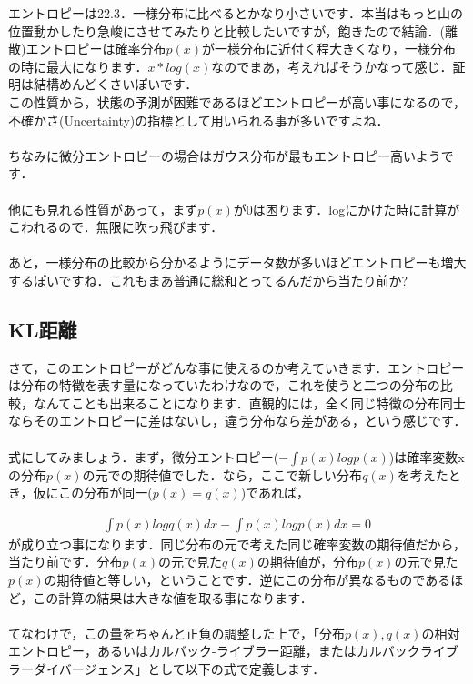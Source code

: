 \documentclass[11pt,a4paper]{jsarticle}                    %
\begin{document}
エントロピーは22.3．一様分布に比べるとかなり小さいです．本当はもっと山の位置動かしたり急峻にさせてみたりと比較したいですが，飽きたので結論．(離散)エントロピーは確率分布$p(x)$が一様分布に近付く程大きくなり，一様分布の時に最大になります．$x * log(x)$なのでまあ，考えればそうかなって感じ．証明は結構めんどくさいぽいです．\\
この性質から，状態の予測が困難であるほどエントロピーが高い事になるので，不確かさ(Uncertainty)の指標として用いられる事が多いですよね．\\
\\
ちなみに微分エントロピーの場合はガウス分布が最もエントロピー高いようです．\\
\\
他にも見れる性質があって，まず$p(x)$が0は困ります．logにかけた時に計算がこわれるので．無限に吹っ飛びます．\\
\\
あと，一様分布の比較から分かるようにデータ数が多いほどエントロピーも増大するぽいですね．これもまあ普通に総和とってるんだから当たり前か?

\subsection{KL距離}
さて，このエントロピーがどんな事に使えるのか考えていきます．エントロピーは分布の特徴を表す量になっていたわけなので，これを使うと二つの分布の比較，なんてことも出来ることになります．直観的には，全く同じ特徴の分布同士ならそのエントロピーに差はないし，違う分布なら差がある，という感じです．\\
\\
式にしてみましょう．まず，微分エントロピー($- \int p(x) log p(x)$)は確率変数xの分布$p(x)$の元での期待値でした．なら，ここで新しい分布$q(x)$を考えたとき，仮にこの分布が同一($p(x) = q(x)$)であれば，

\begin{eqnarray}
\label{eq:KL1}
  \int p(x) log q(x)dx - \int p(x) log p(x)dx= 0
\end{eqnarray}
が成り立つ事になります．同じ分布の元で考えた同じ確率変数の期待値だから，当たり前です．分布$p(x)$の元で見た$q(x)$の期待値が，分布$p(x)$の元で見た$p(x)$の期待値と等しい，ということです．逆にこの分布が異なるものであるほど，この計算の結果は大きな値を取る事になります．\\
\\
てなわけで，この量をちゃんと正負の調整した上で，「分布$p(x), q(x)$の相対エントロピー，あるいはカルバック-ライブラー距離，またはカルバックライブラーダイバージェンス」として以下の式で定義します\cite{prml}．
\end{document}
